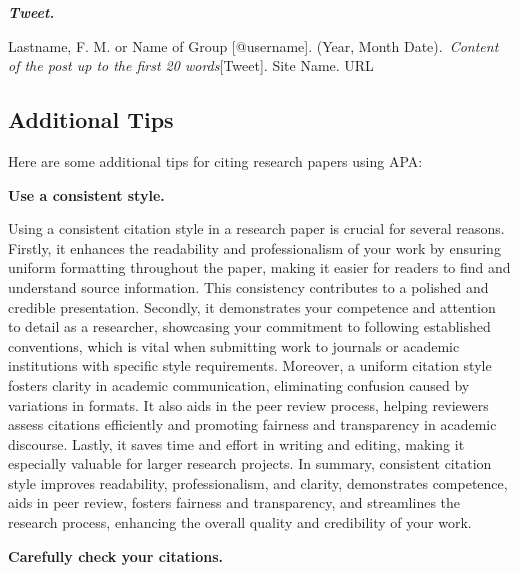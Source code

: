 \documentclass[
  b5paper]{book}
\begin{document}
\textbf{\emph{Tweet.}}

Lastname, F. M. or Name of Group {[}@username{]}. (Year, Month Date).~\emph{Content of the post up to the first 20 words}{[}Tweet{]}. Site Name. URL

\hypertarget{additional-tips-1}{%
\subsection*{Additional Tips}\label{additional-tips-1}}

Here are some additional tips for citing research papers using APA:

\textbf{Use a consistent style.}

Using a consistent citation style in a research paper is crucial for several reasons. Firstly, it enhances the readability and professionalism of your work by ensuring uniform formatting throughout the paper, making it easier for readers to find and understand source information. This consistency contributes to a polished and credible presentation. Secondly, it demonstrates your competence and attention to detail as a researcher, showcasing your commitment to following established conventions, which is vital when submitting work to journals or academic institutions with specific style requirements. Moreover, a uniform citation style fosters clarity in academic communication, eliminating confusion caused by variations in formats. It also aids in the peer review process, helping reviewers assess citations efficiently and promoting fairness and transparency in academic discourse. Lastly, it saves time and effort in writing and editing, making it especially valuable for larger research projects. In summary, consistent citation style improves readability, professionalism, and clarity, demonstrates competence, aids in peer review, fosters fairness and transparency, and streamlines the research process, enhancing the overall quality and credibility of your work.

\textbf{Carefully check your citations.}
\end{document}
